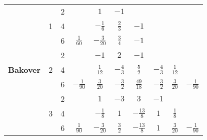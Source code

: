 \begin{table}[H]
\begin{tabular}{|c|c|c|c|c|c|c|c|c|c|}
    \multirow{12}{*}{\textbf{\footnotesize{Bakover}}}
                                                      & \multirow{3}{*}{1}           & 2                           &                  & $1$              & $-1$            &                  &                   &                    &                  \\ \cline{3-10}
                                                      &                              & 4                           &                  & $-\frac{1}{6}$   & $\frac{2}{3}$   & $-1$             &                   &                    &                  \\ \cline{3-10}
                                                      &                              & 6                           & $\frac{1}{60}$   & $-\frac{3}{20}$  & $\frac{3}{4}$   & $-1$             &                   &                    &                  \\ \cline{2-10}
                                                      & \multirow{3}{*}{2}           & 2                           &                  & $-1$             & $2$             & $-1$             &                   &                    &                  \\ \cline{3-10}
                                                      &                              & 4                           &                  & $\frac{1}{12}$   & $-\frac{4}{3}$  & $\frac{5}{2}$    & $-\frac{4}{3}$    & $\frac{1}{12}$     &                  \\ \cline{3-10}
                                                      &                              & 6                           & $-\frac{1}{90}$  & $\frac{3}{20}$   & $-\frac{3}{2}$  & $\frac{49}{18}$  & $-\frac{3}{2}$    & $\frac{3}{20}$     & $-\frac{1}{90}$  \\ \cline{2-10}
                                                      & \multirow{3}{*}{3}           & 2                           &                  & $1$              & $-3$            & $3$              & $-1$              &                    &                  \\ \cline{3-10}
                                                      &                              & 4                           &                  & $-\frac{1}{8}$   & $1$             & $-\frac{13}{8}$  & $1$               & $\frac{1}{8}$      &                  \\ \cline{3-10}
                                                      &                              & 6                           & $\frac{1}{90}$   & $-\frac{3}{20}$  & $\frac{3}{2}$   & $-\frac{13}{8}$  & $1$               & $\frac{3}{20}$     & $-\frac{1}{90}$  \\ \cline{2-10}

\end{tabular}
\end{table}
